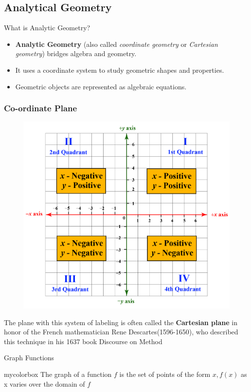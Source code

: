 \documentclass{beamer}
\begin{document}
\subsection{Analytical Geometry}
\begin{frame}{What is Analytic Geometry?}
  \begin{itemize}
      \item \textbf{Analytic Geometry} (also called \textit{coordinate geometry} or \textit{Cartesian geometry}) bridges algebra and geometry.
      \item It uses a coordinate system to study geometric shapes and properties.
      \item Geometric objects are represented as algebraic equations.
  \end{itemize}
\end{frame}
\begin{frame}
  \frametitle{Co-ordinate Plane}
  \begin{figure}[h]    
      \centering
      \includegraphics[scale=0.23]{cartesian.png}
\end{figure}
The plane with this system of labeling is often called the \textbf{Cartesian plane} in honor of the French mathematician Rene Descartes(1596-1650), who described this technique in his 1637 book Discourse on Method
\end{frame}
\begin{frame}{Graph Functions}
  \begin{beamercolorbox}[wd=\textwidth,rounded=true,shadow=true]{mycolorbox}
The graph of a function \(f\) is the set of points of the form \(x, f (x)\) as x varies
over the domain of \(f\)
  \end{beamercolorbox}
\end{frame}
\end{document}
